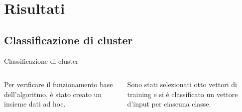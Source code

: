 \documentclass{beamer}
\begin{document}
    \section*{Risultati}
    \subsection{Classificazione di cluster}

    \begin{frame}{Classificazione di cluster}
        \begin{columns}
            Per verificare il funzionamento base dell'algoritmo, 
            è stato creato un insieme dati ad hoc. 

            \vspace{.7cm}

            Sono stati selezionati otto vettori di training 
            e si è classificato un vettore d'input per ciascuna classe. 


\end{columns}
\end{frame}
\end{document}
